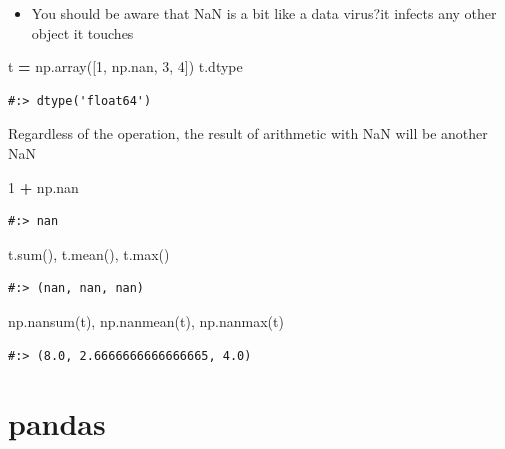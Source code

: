 \documentclass[
]{book}
\newenvironment{Shaded}{\begin{snugshade}}{\end{snugshade}}
\newcommand{\BuiltInTok}[1]{#1}
\newcommand{\DecValTok}[1]{\textcolor[rgb]{0.06,0.06,0.06}{#1}}
\newcommand{\NormalTok}[1]{#1}
\newcommand{\OperatorTok}[1]{\textcolor[rgb]{0.43,0.43,0.43}{\textbf{#1}}}
\providecommand{\tightlist}{%
  \setlength{\itemsep}{0pt}\setlength{\parskip}{0pt}}
\begin{document}
\begin{itemize}
\tightlist
\item
  You should be aware that NaN is a bit like a data virus?it infects any other object it touches
\end{itemize}

\begin{Shaded}
\begin{Highlighting}[]
\NormalTok{t }\OperatorTok{=}\NormalTok{ np.array([}\DecValTok{1}\NormalTok{, np.nan, }\DecValTok{3}\NormalTok{, }\DecValTok{4}\NormalTok{]) }
\NormalTok{t.dtype}
\end{Highlighting}
\end{Shaded}

\begin{verbatim}
#:> dtype('float64')
\end{verbatim}

Regardless of the operation, the result of arithmetic with NaN will be another NaN

\begin{Shaded}
\begin{Highlighting}[]
\DecValTok{1} \OperatorTok{+}\NormalTok{ np.nan}
\end{Highlighting}
\end{Shaded}

\begin{verbatim}
#:> nan
\end{verbatim}

\begin{Shaded}
\begin{Highlighting}[]
\NormalTok{t.}\BuiltInTok{sum}\NormalTok{(), t.mean(), t.}\BuiltInTok{max}\NormalTok{()}
\end{Highlighting}
\end{Shaded}

\begin{verbatim}
#:> (nan, nan, nan)
\end{verbatim}

\begin{Shaded}
\begin{Highlighting}[]
\NormalTok{np.nansum(t), np.nanmean(t), np.nanmax(t)}
\end{Highlighting}
\end{Shaded}

\begin{verbatim}
#:> (8.0, 2.6666666666666665, 4.0)
\end{verbatim}

\hypertarget{pandas-1}{%
\chapter{pandas}\label{pandas-1}}
\end{document}
